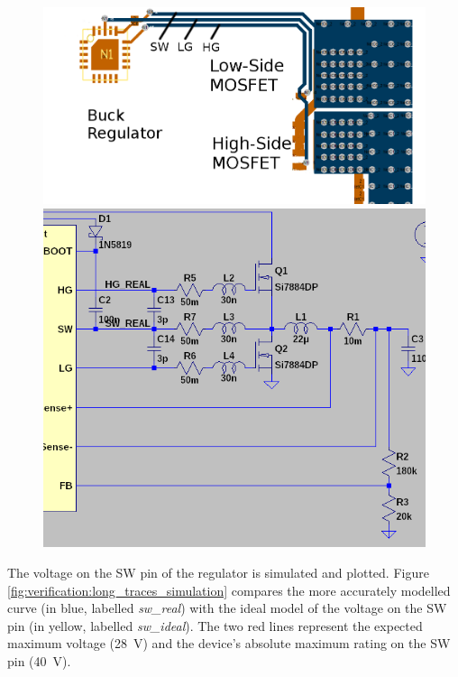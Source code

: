 \begin{figure}[th!]
    \centering
    \begin{minipage}{.6\textwidth}
        \centering
        \includegraphics[width=.9\textwidth]{images/pcb/long-traces.png}
        \caption{}
        \label{fig:verification:long_traces_pcb}
    \end{minipage}
    \begin{minipage}{.38\textwidth}
        \centering
        \includegraphics[width=.9\textwidth]{images/sim/lt3741-transients-circuit-real.png}
        \caption{}
        \label{fig:verification:long_traces_model}
    \end{minipage}
\end{figure}

The voltage on the SW pin of the regulator  is  simulated  and  plotted.  Figure
\ref{fig:verification:long_traces_simulation}  compares  the   more   accurately
modelled curve (in blue, labelled \emph{sw\_real})  with  the ideal model of the
voltage on the SW pin (in yellow, labelled \emph{sw\_ideal}). The  two red lines
represent  the  expected  maximum  voltage  (\SI{28}{\volt})  and  the  device's
absolute maximum rating on the SW pin (\SI{40}{\volt}).

